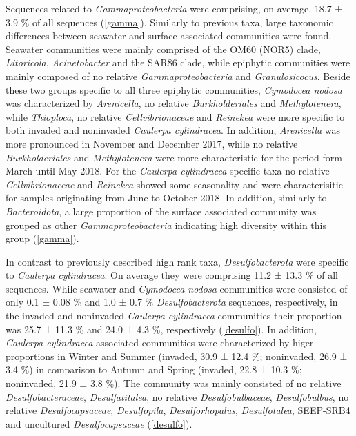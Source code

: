 \documentclass[12pt,]{article}
\begin{document}
Sequences related to \emph{Gammaproteobacteria} were comprising, on
average, 18.7 ± 3.9 \si{\percent} of all sequences (\autoref{gamma}).
Similarly to previous taxa, large taxonomic differences between seawater
and surface associated communities were found. Seawater communities were
mainly comprised of the OM60 (NOR5) clade, \emph{Litoricola},
\emph{Acinetobacter} and the SAR86 clade, while epiphytic communities
were mainly composed of no relative \emph{Gammaproteobacteria} and
\emph{Granulosicocus}. Beside these two groups specific to all three
epiphytic communities, \emph{Cymodocea nodosa} was characterized by
\emph{Arenicella}, no relative \emph{Burkholderiales} and
\emph{Methylotenera}, while \emph{Thioploca}, no relative
\emph{Cellvibrionaceae} and \emph{Reinekea} were more specific to both
invaded and noninvaded \emph{Caulerpa cylindracea}. In addition,
\emph{Arenicella} was more pronounced in November and December 2017,
while no relative \emph{Burkholderiales} and \emph{Methylotenera} were
more characteristic for the period form March until May 2018. For the
\emph{Caulerpa cylindracea} specific taxa no relative
\emph{Cellvibrionaceae} and \emph{Reinekea} showed some seasonality and
were characterisitic for samples originating from June to October 2018.
In addition, similarly to \emph{Bacteroidota}, a large proportion of the
surface associated community was grouped as other
\emph{Gammaproteobacteria} indicating high diversity within this group
(\autoref{gamma}).

In contrast to previously described high rank taxa,
\emph{Desulfobacterota} were specific to \emph{Caulerpa cylindracea}. On
average they were comprising 11.2 ± 13.3 \si{\percent} of all sequences.
While seawater and \emph{Cymodocea nodosa} communities were consisted of
only 0.1 ± 0.08 \si{\percent} and 1.0 ± 0.7 \si{\percent}
\emph{Desulfobacterota} sequences, respectively, in the invaded and
noninvaded \emph{Caulerpa cylindracea} communities their proportion was
25.7 ± 11.3 \si{\percent} and 24.0 ± 4.3 \si{\percent}, respectively
(\autoref{desulfo}). In addition, \emph{Caulerpa cylindracea} associated
communities were characterized by higer proportions in Winter and Summer
(invaded, 30.9 ± 12.4 \si{\percent}; noninvaded, 26.9 ± 3.4
\si{\percent}) in comparison to Autumn and Spring (invaded, 22.8 ± 10.3
\si{\percent}; noninvaded, 21.9 ± 3.8 \si{\percent}). The community was
mainly consisted of no relative \emph{Desulfobacteraceae},
\emph{Desulfatitalea}, no relative \emph{Desulfobulbaceae},
\emph{Desulfobulbus}, no relative \emph{Desulfocapsaceae},
\emph{Desulfopila}, \emph{Desulforhopalus}, \emph{Desulfotalea},
SEEP-SRB4 and uncultured \emph{Desulfocapsaceae} (\autoref{desulfo}).
\end{document}
